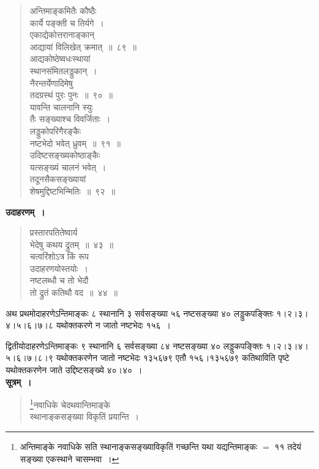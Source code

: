 \documentclass[11pt, openany]{book}
\begin{document}
\begin{quote}
{\gk अन्तिमाङ्कमितैः कौष्ठैः\\
कार्ये पङ्क्ती च तिर्यगे~।\\
एकाद्येकोत्तरानाङ्कान्\\
आद्यायां विलिखेत् क्रमात्~॥~८९~॥\\
आद्यकोष्ठेष्वधःस्थायां\\
स्थानसंमितलड्डुकान्~।\\
नैरन्तर्येणादिमेषु\\
तदग्रस्थं पुरः पुनः~॥~९०~॥\\
यावन्ति चालनानि स्युः\\
तैः सङ्ख्याश्च विवर्जिताः~।\\
लड्डुकोपरिगैरङ्कैः\\
नष्टभेदो भवेत् ध्रुवम्~॥~९१~॥\\
उदिष्टसङ्ख्यकोष्ठाङ्कैः\\
यत्सङ्ख्यं चालनं भवेत्~।\\
तदूनसैकसङ्ख्यायां\\
शेषमुद्दिष्टभिन्मितिः~॥~९२~॥}
\end{quote}

\newpage

\textbf{उदाहरणम्~।}

\begin{quote}
{\ex प्रस्तारपतितेष्वार्य\\
भेदेषु कथय द्रुतम्~॥~४३~॥\\
चत्वरिंशोऽत्र किं रूप\\
उदाहरणयोस्तयोः~।\\
नष्टलब्धौ च तो भेदौ\\
तो द्रुतं कतिथौ वद~॥~४४~॥}	
\end{quote}

अथ प्रथमोदाहरणेऽन्तिमाङ्कः ८ स्थानानि ३ सर्वसङ्ख्या ५६ नष्टसङ्ख्या ४० लड्डुकपङ्क्तिः १।२।३।४।५।६।७।८ यथोक्तकरणे न जातो नष्टभेदः १५६~।
\vspace{3mm}

द्वितीयोदाहरणेऽन्तिमाङ्कः ९ स्थानानि ६ सर्वसङ्ख्या ८४ नष्टसङ्ख्या ४० लड्डुकपङ्क्तिः १।२।३।४।५।६।७।८।९ यथोक्तकरणेन जातो नष्टभेदः १३५६७९ एतौ १५६।१३५६७९ कतिथाविति पृष्टे यथोक्तकरणेन जाते उद्दिष्टसङ्ख्ये ४०।४०~।\\

\textbf{सूत्रम्~।}

 \label{13.93.1}
\begin{quote}
\renewcommand{\thefootnote}{१}\footnote{अन्तिमाङ्के नवाधिके सति स्थानाङ्कसङ्ख्याविकृतिं गच्छन्ति यथा यद्यन्तिमाङ्कः $=$ ११ तदेयं सङ्ख्या एकस्थाने चासम्भवा~।}{\gk नवाधिके चेदथवान्तिमाङ्के\\
स्थानाङ्कसङ्ख्या विकृतिं प्रयान्ति~।}
\end{quote}
\end{document}
